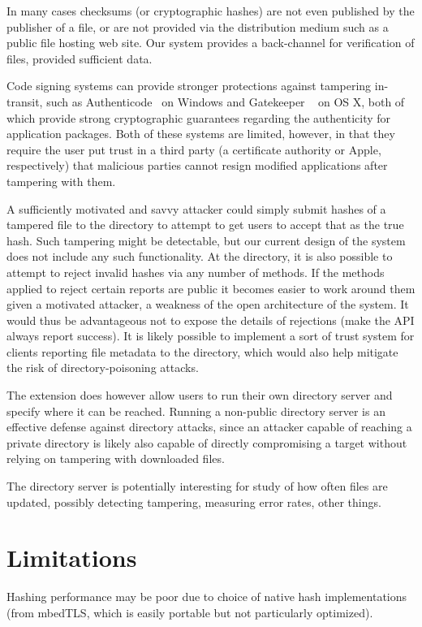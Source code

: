 \documentclass[letterpaper,twocolumn,10pt]{article}
\begin{document}
In many cases checksums (or cryptographic hashes) are not even published by the publisher of a file, or are not provided via the distribution medium such as a public file hosting web site. Our system provides a back-channel for verification of files, provided sufficient data.

Code signing systems can provide stronger protections against tampering in-transit, such as Authenticode~\cite{Authenticode} on Windows and Gatekeeper ~\cite{Gatekeeper} on OS X, both of which provide strong cryptographic guarantees regarding the authenticity for application packages. Both of these systems are limited, however, in that they require the user put trust in a third party (a certificate authority or Apple, respectively) that malicious parties cannot resign modified applications after tampering with them.

A sufficiently motivated  and savvy attacker could simply submit hashes of a tampered file to the directory to attempt to get users to accept that as the true hash. Such tampering might be detectable, but our current design of the system does not include any such functionality. At the directory, it is also possible to attempt to reject invalid hashes via any number of methods. If the methods applied to reject certain reports are public it becomes easier to work around them given a motivated attacker, a weakness of the open architecture of the system. It would thus be advantageous not to expose the details of rejections (make the API always report success). It is likely possible to implement a sort of trust system for clients reporting file metadata to the directory, which would also help mitigate the risk of directory-poisoning attacks.

The extension does however allow users to run their own directory server and specify where it can be reached. Running a non-public directory server is an effective defense against directory attacks, since an attacker capable of reaching a private directory is likely also capable of directly compromising a target without relying on tampering with downloaded files.

The directory server is potentially interesting for study of how often files are updated, possibly detecting tampering, measuring error rates, other things.

\section{Limitations}

Hashing performance may be poor due to choice of native hash implementations (from mbedTLS, which is easily portable but not particularly optimized).
\end{document}
